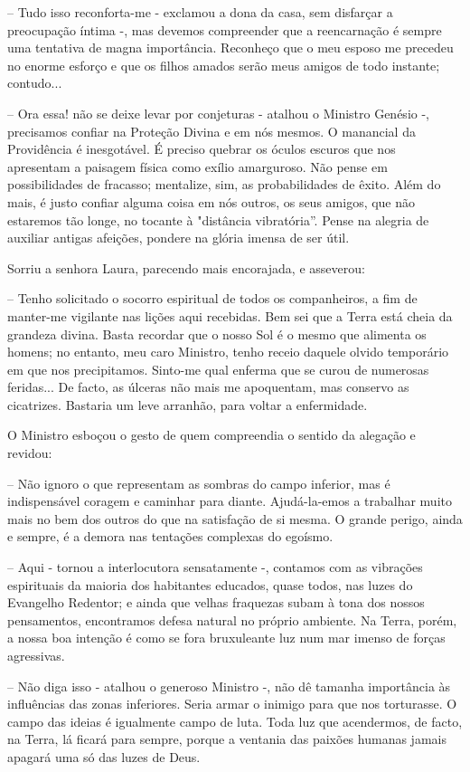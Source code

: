 \documentclass[portuguese,12pt,a4paper]{scrbook}
\begin{document}
	– Tudo isso reconforta-me - exclamou a dona da casa, sem disfarçar a preocupação íntima -, mas devemos compreender que a reencarnação é sempre uma tentativa de magna importância. Reconheço que o meu esposo me precedeu no enorme esforço e que os filhos amados serão meus amigos de todo instante; contudo...
	
	– Ora essa! não se deixe levar por conjeturas - atalhou o Ministro Genésio -, precisamos confiar na Proteção Divina e em nós mesmos. O manancial da Providência é inesgotável. É preciso quebrar os óculos escuros que nos apresentam a paisagem física como exílio amarguroso. Não pense em possibilidades de fracasso; mentalize, sim, as probabilidades de êxito. Além do mais, é justo confiar alguma coisa em nós outros, os seus amigos, que não estaremos tão longe, no tocante à "distância vibratória”. Pense na alegria de auxiliar antigas afeições, pondere na glória imensa de ser útil.
	
	Sorriu a senhora Laura, parecendo mais encorajada, e asseverou:
	
	– Tenho solicitado o socorro espiritual de todos os companheiros, a fim de manter-me vigilante nas lições aqui recebidas. Bem sei que a Terra está cheia da grandeza divina. Basta recordar que o nosso Sol é o mesmo que alimenta os homens; no entanto, meu caro Ministro, tenho receio daquele olvido temporário em que nos precipitamos. Sinto-me qual enferma que se curou de numerosas feridas... De facto, as úlceras não mais me apoquentam, mas conservo as cicatrizes. Bastaria um leve arranhão, para voltar a enfermidade.
	
	O Ministro esboçou o gesto de quem compreendia o sentido da alegação e revidou:
	
	– Não ignoro o que representam as sombras do campo inferior, mas é indispensável coragem e caminhar para diante. Ajudá-la-emos a trabalhar muito mais no bem dos outros do que na satisfação de si mesma. O grande perigo, ainda e sempre, é a demora nas tentações complexas do egoísmo.
	
	– Aqui - tornou a interlocutora sensatamente -, contamos com as vibrações espirituais da maioria dos habitantes educados, quase todos, nas luzes do Evangelho Redentor; e ainda que velhas fraquezas subam à tona dos nossos pensamentos, encontramos defesa natural no próprio ambiente. Na Terra, porém, a nossa boa intenção é como se fora bruxuleante luz num mar imenso de forças agressivas.
	
	– Não diga isso - atalhou o generoso Ministro -, não dê tamanha importância às influências das zonas inferiores. Seria armar o inimigo para que nos torturasse. O campo das ideias é igualmente campo de luta. Toda luz que acendermos, de facto, na Terra, lá ficará para sempre, porque a ventania das paixões humanas jamais apagará uma só das luzes de Deus.
	
\end{document}
